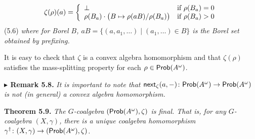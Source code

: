 \documentclass[11pt,a4paper]{amsart}
\begin{document}
\hypertarget{html:S5.E6}{}   %
\hypertarget{html:S5.E6.m1}{}\[\zeta(\rho)(a)=\left\{\begin{array}[]{ll}\bot&\mbox{if $\rho(B_{a})=0$}\\
\rho(B_{a})\cdot\big{(}B\mapsto\rho(aB)/\rho(B_{a})\big{)}&\mbox{if $\rho(B_{a})>0$}\end{array}\right.\]  (5.6)   \emph{where for Borel %
\hypertarget{html:S5.Thmtheorem7.p1.m4}{}\({B}\), %
\hypertarget{html:S5.Thmtheorem7.p1.m5}{}\({aB=\{(a,a_{1},\dots)\mid(a_{1},\dots)\in B\}}\) is the Borel set obtained by prefixing.}
\par\medskip
\hypertarget{html:S5.SS0.SSS0.Px1.SPx1.p2}{} It is easy to check that %
\hypertarget{html:S5.SS0.SSS0.Px1.SPx1.p2.m1}{}\({\zeta}\) is a convex algebra homomorphism and that %
\hypertarget{html:S5.SS0.SSS0.Px1.SPx1.p2.m2}{}\({\zeta(\rho)}\) satisfies the mass-splitting property for each %
\hypertarget{html:S5.SS0.SSS0.Px1.SPx1.p2.m3}{}\({\rho\in\text{\sf Prob}(A^{\omega})}\).
\par\medskip
\hypertarget{html:S5.Thmtheorem8}{} \par\noindent\textbf{%
\hypertarget{html:S5.Thmtheorem8.m1}{}\({\blacktriangleright}\) Remark 5.8.}\quad  %
\hypertarget{html:S5.Thmtheorem8.p1}{} \emph{It is important to note that %
\hypertarget{html:S5.Thmtheorem8.p1.m1}{}\({\mbox{\sf next}_{\zeta}(a,-)\colon\text{\sf Prob}(A^{\omega})\to\text{\sf Prob}(A^{\omega})}\) is \emph{not} (in general) a convex algebra homomorphism.}
\par\medskip
\hypertarget{html:S5.Thmtheorem9}{} \par\noindent\textbf{\textbf{Theorem 5.9}\textbf{.}}\quad  %
\hypertarget{html:S5.Thmtheorem9.p1}{} \emph{The %
\hypertarget{html:S5.Thmtheorem9.p1.m1}{}\({G}\)-coalgebra %
\hypertarget{html:S5.Thmtheorem9.p1.m2}{}\({(\text{\sf Prob}(A^{\omega}),\zeta)}\) is final. That is, for any %
\hypertarget{html:S5.Thmtheorem9.p1.m3}{}\({G}\)-coalgebra %
\hypertarget{html:S5.Thmtheorem9.p1.m4}{}\({(X,\gamma)}\), there is a unique coalgebra homomorphism %
\hypertarget{html:S5.Thmtheorem9.p1.m5}{}\({\gamma^{{\dagger}}\colon(X,\gamma)\to(\text{\sf Prob}(A^{\omega}),\zeta)}\).}
\end{document}
